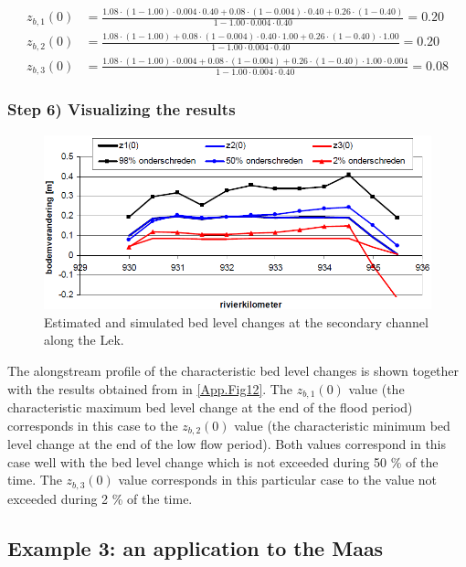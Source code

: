 \begin{align}
z_{b,1}(0) &= \tfrac{1.08 \cdot (1-1.00) \cdot 0.004 \cdot 0.40 + 0.08 \cdot (1-0.004) \cdot 0.40 + 0.26 \cdot (1-0.40)}{1 - 1.00 \cdot 0.004 \cdot 0.40} = 0.20 \\
z_{b,2}(0) &= \tfrac{1.08 \cdot (1-1.00) + 0.08 \cdot (1-0.004) \cdot 0.40 \cdot 1.00 + 0.26 \cdot (1-0.40) \cdot 1.00}{1 - 1.00 \cdot 0.004 \cdot 0.40} = 0.20 \\
z_{b,3}(0) &= \tfrac{1.08 \cdot (1-1.00) \cdot 0.004 + 0.08 \cdot (1-0.004) + 0.26 \cdot (1-0.40) \cdot 1.00 \cdot 0.004}{1 - 1.00 \cdot 0.004 \cdot 0.40} = 0.08
\end{align}

\subsubsection*{Step 6) Visualizing the results}

\begin{figure}
\includegraphics[width=\columnwidth]{figures/Fig12.png}
\caption{Estimated and simulated bed level changes at the secondary channel along the Lek.}
\label{App.Fig12}
\end{figure}

The alongstream profile of the characteristic bed level changes is shown together with the results obtained from \sobek in \autoref{App.Fig12}.
The $z_{b,1}(0)$ value (the characteristic maximum bed level change at the end of the flood period) corresponds in this case to the $z_{b,2}(0)$ value (the characteristic minimum bed level change at the end of the low flow period).
Both values correspond in this case well with the bed level change which is not exceeded during 50 \% of the time.
The $z_{b,3}(0)$ value corresponds in this particular case to the value not exceeded during 2 \% of the time.


\subsection{Example 3: an application to the Maas}

